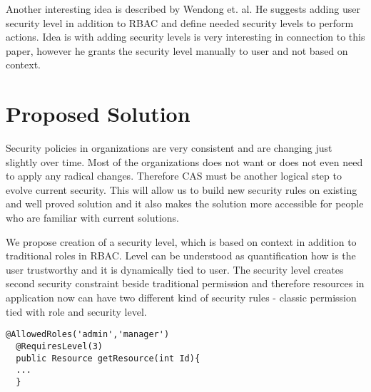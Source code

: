 \documentclass{poster15}
\begin{document}
Another interesting idea is described by Wendong et. al. \cite{wendong} He suggests adding user security level in addition to RBAC and define needed security levels to perform actions. Idea is with adding security levels is very interesting in connection to this paper, however he grants the security level manually to user and not based on context.

\section{Proposed Solution}

Security policies in organizations are very consistent and are changing just slightly over time. Most of the organizations does not want or does not even need to apply any radical changes. Therefore CAS must be another logical step to evolve current security. This will allow us to build new security rules on existing and well proved solution and it also makes the solution more accessible for people who are familiar with current solutions.

We propose creation of a security level, which is based on context in addition to traditional roles in RBAC. Level can be understood as quantification how is the user trustworthy and it is dynamically tied to user. The security level creates second security constraint beside traditional permission and therefore resources in application now can have two different kind of security rules - classic permission tied with role and security level.



 
\begin{lstlisting}[]
  @AllowedRoles('admin','manager')
  @RequiresLevel(3)
  public Resource getResource(int Id){
  ...
  }
                
\end{lstlisting}
\end{document}
